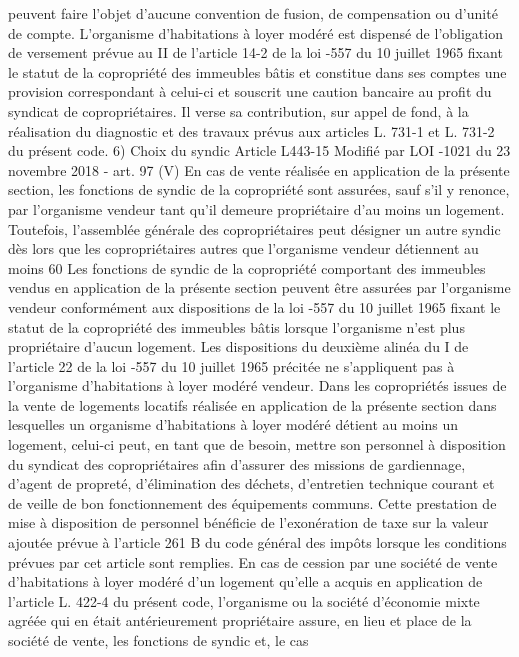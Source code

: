 \documentclass[11pt,a4paper]{report}
\begin{document}
	peuvent faire l'objet d'aucune convention de fusion, de compensation ou d'unité de compte.
	L'organisme d'habitations à loyer modéré est dispensé de l'obligation de versement prévue au II de l'article 14-2
	de la loi -557 du 10 juillet 1965 fixant le statut de la copropriété des immeubles bâtis et constitue dans ses
	comptes une provision correspondant à celui-ci et souscrit une caution bancaire au profit du syndicat de
	copropriétaires. Il verse sa contribution, sur appel de fond, à la réalisation du diagnostic et des travaux prévus
	aux articles L. 731-1 et L. 731-2 du présent code.
	6) Choix du syndic
	Article L443-15 Modifié par LOI -1021 du 23 novembre 2018 - art. 97 (V)
	En cas de vente réalisée en application de la présente section, les fonctions de syndic de la copropriété sont
	assurées, sauf s'il y renonce, par l'organisme vendeur tant qu'il demeure propriétaire d'au moins un logement.
	Toutefois, l'assemblée générale des copropriétaires peut désigner un autre syndic dès lors que les
	copropriétaires autres que l'organisme vendeur détiennent au moins 60 %
	Les fonctions de syndic de la copropriété comportant des immeubles vendus en application de la présente
	section peuvent être assurées par l'organisme vendeur conformément aux dispositions de la loi -557 du 10
	juillet 1965 fixant le statut de la copropriété des immeubles bâtis lorsque l'organisme n'est plus propriétaire
	d'aucun logement.
	Les dispositions du deuxième alinéa du I de l'article 22 de la loi -557 du 10 juillet 1965 précitée ne
	s'appliquent pas à l'organisme d'habitations à loyer modéré vendeur.
	Dans les copropriétés issues de la vente de logements locatifs réalisée en application de la présente section dans
	lesquelles un organisme d'habitations à loyer modéré détient au moins un logement, celui-ci peut, en tant que de
	besoin, mettre son personnel à disposition du syndicat des copropriétaires afin d'assurer des missions de
	gardiennage, d'agent de propreté, d'élimination des déchets, d'entretien technique courant et de veille de bon
	fonctionnement des équipements communs. Cette prestation de mise à disposition de personnel bénéficie de
	l'exonération de taxe sur la valeur ajoutée prévue à l'article 261 B du code général des impôts lorsque les
	conditions prévues par cet article sont remplies.
	En cas de cession par une société de vente d'habitations à loyer modéré d'un logement qu'elle a acquis en
	application de l'article L. 422-4 du présent code, l'organisme ou la société d'économie mixte agréée qui en était
	antérieurement propriétaire assure, en lieu et place de la société de vente, les fonctions de syndic et, le cas
\end{document}
